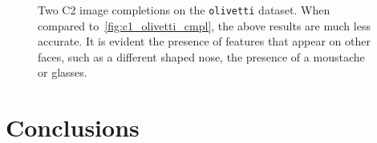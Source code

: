 \documentclass{amsart}
\theoremstyle{plain}
\numberwithin{equation}{section}
\newcommand{\code}[1]{\lstinline[mathescape=true]{#1}}
\begin{document}
\begin{figure}[h]
  \captionsetup{singlelinecheck=false,justification=justified,margin=0cm}
  \caption{Two C2 image completions on the \code{olivetti} dataset. When compared
  to~\autoref{fig:c1_olivetti_cmpl}, the above results are much less accurate. It is evident the
  presence of features that appear on other faces, such as a different shaped nose, the presence of
  a moustache or glasses.}\label{fig:c2_olivetti_cmpl}
\end{figure}
\section{Conclusions}


\newpage

\printbibliography[]
\end{document}
